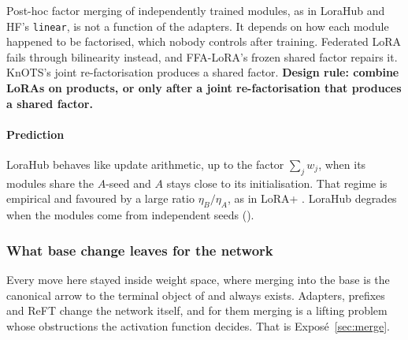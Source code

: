 \begin{explains}
Post-hoc factor merging of independently trained modules, as in LoraHub and HF's \texttt{linear}, is not a function of
the adapters. It depends on how each module happened to be factorised, which nobody controls after training. Federated
LoRA fails through bilinearity instead, and FFA-LoRA's frozen shared factor repairs it. KnOTS's joint
re-factorisation produces a shared factor. \textbf{Design rule: combine LoRAs on products, or only after a joint
re-factorisation that produces a shared factor.}
\end{explains}

\paragraph{Prediction} LoraHub behaves like update arithmetic, up to the factor $\sum_jw_j$, when its modules share
the $A$-seed and $A$ stays close to its initialisation. That regime is empirical and favoured by a large ratio
$\eta_B/\eta_A$, as in LoRA+ \citep{hayou2024lora}. LoraHub degrades when the modules come from independent seeds
().

\subsubsection{What base change leaves for the network}\label{sec:base-next}

Every move here stayed inside weight space, where merging into the base is the canonical arrow to the terminal object
of  and always exists. Adapters, prefixes and ReFT change the network itself, and for them
merging is a lifting problem whose obstructions the activation function decides. That is Exposé~\ref{sec:merge}.

